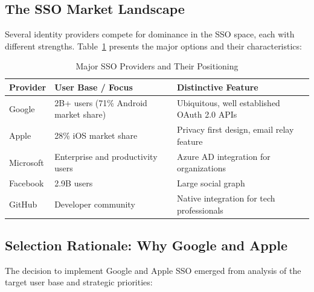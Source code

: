 \subsection{The SSO Market Landscape}

Several identity providers compete for dominance in the SSO space, each with different strengths. Table~\ref{tab:sso_comparison} presents the major options and their characteristics:

\begin{table}[H]
\centering
\caption{Major SSO Providers and Their Positioning}
\label{tab:sso_comparison}
\begin{tabular}{|l|p{4.5cm}|p{5.5cm}|}
\hline
\textbf{Provider} & \textbf{User Base / Focus} & \textbf{Distinctive Feature} \\ \hline
Google & 2B+ users (71\% Android market share) & Ubiquitous, well established OAuth 2.0 APIs \\ \hline
Apple & 28\% iOS market share & Privacy first design, email relay feature \\ \hline
Microsoft & Enterprise and productivity users & Azure AD integration for organizations \\ \hline
Facebook & 2.9B users & Large social graph \\ \hline
GitHub & Developer community & Native integration for tech professionals \\ \hline
\end{tabular}
\end{table}

\subsection{Selection Rationale: Why Google and Apple}

The decision to implement Google and Apple SSO emerged from analysis of the target user base and strategic priorities:

